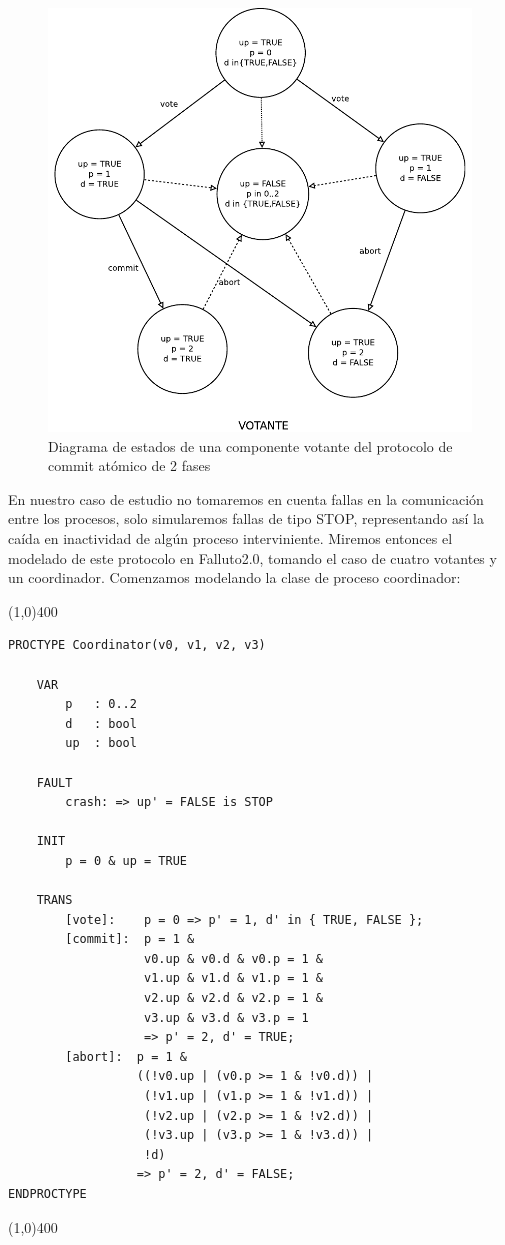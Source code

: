 \documentclass[titlepage, 12pt]{book}
\begin{document}
\begin{figure}[htp]
  \centering
    \includegraphics[scale=0.75]{Imagenes/2pcVoter.pdf}
  \caption{Diagrama de estados de una componente votante del protocolo de commit at\'omico de 2 fases}
  \label{2pcv}
\end{figure}


En nuestro caso de estudio no tomaremos en cuenta fallas en la comunicaci\'on entre los procesos, solo simularemos fallas de tipo STOP, representando as\'i la ca\'ida en inactividad de alg\'un proceso interviniente. Miremos entonces el modelado de este protocolo en Falluto2.0, tomando el caso de cuatro votantes y un coordinador. Comenzamos modelando la clase de proceso coordinador:

\noindent \line(1,0){400}
\begin{verbatim}
PROCTYPE Coordinator(v0, v1, v2, v3)

    VAR
        p   : 0..2
        d   : bool
        up  : bool
    
    FAULT 
        crash: => up' = FALSE is STOP

    INIT
        p = 0 & up = TRUE

    TRANS
        [vote]:    p = 0 => p' = 1, d' in { TRUE, FALSE };
        [commit]:  p = 1 &
                   v0.up & v0.d & v0.p = 1 &
                   v1.up & v1.d & v1.p = 1 &
                   v2.up & v2.d & v2.p = 1 &
                   v3.up & v3.d & v3.p = 1 
                   => p' = 2, d' = TRUE;
        [abort]:  p = 1 &
                  ((!v0.up | (v0.p >= 1 & !v0.d)) |
                   (!v1.up | (v1.p >= 1 & !v1.d)) |
                   (!v2.up | (v2.p >= 1 & !v2.d)) |
                   (!v3.up | (v3.p >= 1 & !v3.d)) |
                   !d)
                  => p' = 2, d' = FALSE;
ENDPROCTYPE
\end{verbatim}
\line(1,0){400}
~\\
\end{document}
